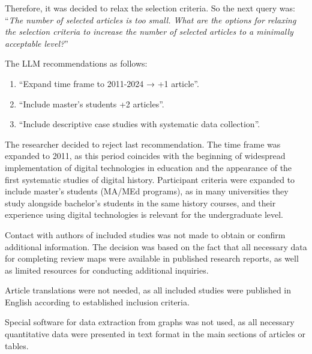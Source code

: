 \documentclass[
hf,
]{ceurart}
\begin{document}
Therefore, it was decided to relax the selection criteria. So the next query was: ``\textit{The number of selected articles is too small. What are the options for relaxing the selection criteria to increase the number of selected articles to a minimally acceptable level?}''

The LLM recommendations as follows:

\begin{enumerate}
    \item ``Expand time frame to 2011-2024 → +1 article''.    \item ``Include master's students +2 articles''.
    
    \item ``Include descriptive case studies with systematic data collection''.
\end{enumerate}

The researcher decided to reject last recommendation.  
The time frame was expanded to 2011, as this period coincides with the beginning of widespread implementation of digital technologies in education and the appearance of the first systematic studies of digital history.
Participant criteria were expanded to include master's students (MA/MEd programs), as in many universities they study alongside bachelor's students in the same history courses, and their experience using digital technologies is relevant for the undergraduate level.

Contact with authors of included studies was not made to obtain or confirm additional information. The decision was based on the fact that all necessary data for completing review maps were available in published research reports, as well as limited resources for conducting additional inquiries.


Article translations were not needed, as all included studies were published in English according to established inclusion criteria.


Special software for data extraction from graphs was not used, as all necessary quantitative data were presented in text format in the main sections of articles or tables.
\end{document}
